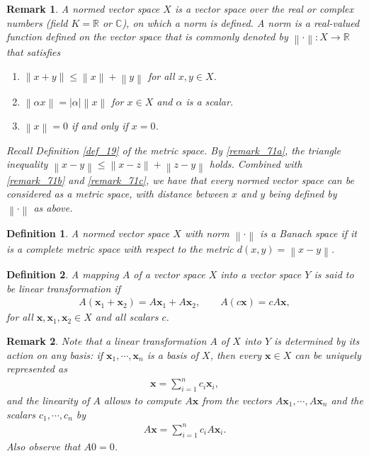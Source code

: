 \documentclass[10pt]{book}
\newtheorem{definition}{Definition}[chapter]
\newtheorem{remark}{Remark}[chapter]
\theoremstyle{definition}
\numberwithin{equation}{chapter}
\begin{document}
\begin{remark}
A normed vector space $X$ is a vector space over the real or complex numbers (field $K = \mathbb{R}$ or $\mathbb{C}$), on which a norm is defined. A norm is a real-valued function defined on the vector space that is commonly denoted by $\left\|\cdot\right\|: X \to \mathbb{R}$ that satisfies
\begin{enumerate}[label=(\roman*)]
    \item $\left\|x + y\right\| \leq \left\|x\right\| + \left\|y\right\|$ for all $x,y \in X$. \label{remark_71a} 
    
    \item $\left\|\alpha x\right\| = \left|\alpha\right| \left\|x\right\|$ for $x \in X$ and $\alpha$ is a scalar. \label{remark_71b}
    
    \item $\left\|x\right\| = 0$ if and only if $x = 0$. \label{remark_71c}
\end{enumerate}

Recall Definition \ref{def_19} of the metric space. By \ref{remark_71a}, the triangle inequality $\left\|x - y\right\| \leq \left\|x - z\right\| + \left\|z - y\right\|$ holds. Combined with \ref{remark_71b} and \ref{remark_71c}, we have that every normed vector space can be considered as a metric space, with distance between $x$ and $y$ being defined by $\left\|\cdot\right\|$ as above.
\end{remark}

\medskip

\begin{definition}
A normed vector space $X$ with norm $\left\|\cdot\right\|$ is a Banach space if it is a complete metric space with respect to the metric $d(x,y) = \left\|x - y\right\|$.
\end{definition}

\medskip

\begin{definition}
A mapping $A$ of a vector space $X$ into a vector space $Y$ is said to be linear transformation if 
\begin{align*}
    A(\mathbf{x}_1 + \mathbf{x}_2) = A \mathbf{x}_1 + A \mathbf{x}_2, \qquad A(c\mathbf{x}) = c A \mathbf{x},
\end{align*}
for all $\mathbf{x}, \mathbf{x}_1, \mathbf{x}_2 \in X$ and all scalars $c$. 
\end{definition}

\begin{remark}
Note that a linear transformation $A$ of $X$ into $Y$ is determined by its action on any basis: if $\mathbf{x}_1, \cdots, \mathbf{x}_n$ is a basis of $X$, then every $\mathbf{x} \in X$ can be uniquely represented as 
\begin{align*}
    \mathbf{x} = \sum^n_{i=1} c_i \mathbf{x}_i,
\end{align*}
and the linearity of $A$ allows to compute $A\mathbf{x}$ from the vectors $A\mathbf{x}_1, \cdots, A\mathbf{x}_n$ and the scalars $c_1, \cdots, c_n$ by
\begin{align*}
    A\mathbf{x} = \sum^n_{i=1} c_i A \mathbf{x}_i.
\end{align*}
Also observe that $A0 = 0$.
\end{remark}
\end{document}
